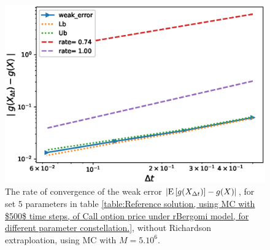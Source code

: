 \FloatBarrier









\begin{figure}[!htb]
		\centering
		\includegraphics[width=0.35\linewidth]{./figures/rBergomi_weak_error_rates/without_richardson/H_002/weak_convergence_order_Bergomi_H_002_K_12_M_3_10_6_CI_relative}	
	\caption{The rate of convergence of the weak error $\left\lvert\mathrm{E}\left[g(X_{\Delta t})\right]-g(X)\right\rvert$, for set $5$ parameters in table \ref{table:Reference solution, using MC with $500$ time steps, of Call option price under rBergomi model, for different parameter constellation.}, without Richardson extraploation, using MC with $M=5.10^6$.}
	\label{fig:Weak_rate_H_002_without_rich_K_12}
\end{figure}


\FloatBarrier


